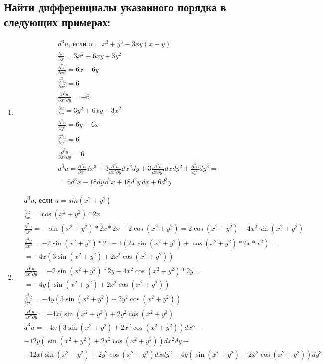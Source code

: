 \documentclass[a4paper, 12pt]{article}
\begin{document}
\subsection{Найти дифференциалы указанного порядка в следующих примерах: }
\begin{enumerate}
 \item %
 \begin{align*}
  & d^3 u \text{, если } u = x^3+y^3 - 3xy(x-y)  \\
  &\frac{\partial u}{\partial x} = 3x^2-6xy+3y^2 \\
  &\frac{\partial^2 u}{\partial x^2} = 6x -6y \\
  &\boxed{\frac{\partial^3 u}{\partial x^3}} = \boxed{6} \\
  &\boxed{\frac{\partial^3 u}{\partial x^2 \partial y}} = \boxed{-6} \\
  &\frac{\partial u}{\partial y} = 3y^2+6xy-3x^2 \\
  &\frac{\partial^2 u}{\partial y^2} = 6y + 6x \\
  &\boxed{\frac{\partial^3 u}{\partial y^3}} = \boxed{6} \\
  &\boxed{\frac{\partial^3 u}{\partial x^2 \partial y}} = \boxed{6} \\
  &\boxed{d^3u} = \frac{\partial^3 u}{\partial x^3}dx^3 + 3\frac{\partial^3 u}{\partial x^2 \partial y}dx^2dy + 3\frac{\partial^3 u}{\partial x \partial y^2}dxdy^2 +
  \frac{\partial^3 u}{\partial y^3}dy^3 = \\
  &= \boxed{6d^3x-18dy\,d^2x+18d^2y\,dx +6d^3y}
 \end{align*}
 
 \item %
 \begin{align*}
    &d^3u\text{, если } u = sin(x^2+y^2) \\
    &\frac{\partial u}{\partial x} = \cos{(x^2+y^2)*2x} \\
    &\frac{\partial^2 u}{\partial x^2} = -\sin{(x^2+y^2)}*2x*2x+2\cos{(x^2+y^2)} = 
    2\cos{(x^2+y^2)} - 4x^2\sin{(x^2+y^2)} \\
    &\boxed{\frac{\partial^3 u}{\partial x^3}} = -2\sin{(x^2+y^2)}*2x-4(2x\sin{(x^2+y^2)}+\cos{(x^2+y^2)}*2x*x^2) = \\
    &=\boxed{-4x(3\sin{(x^2+y^2)}+2x^2\cos{(x^2+y^2)})} \\
    &\boxed{\frac{\partial^3 u}{\partial x^2 \partial y}} = 
    -2\sin{(x^2+y^2)}*2y - 4x^2\cos{(x^2+y^2)}*2y = \\
    &=\boxed{-4y(\sin{(x^2+y^2)}+2x^2\cos{(x^2+y^2)})} \\
    &\boxed{\frac{\partial^3 u}{\partial y^3}} = 
    \boxed{-4y(3\sin{(x^2+y^2)}+2y^2\cos{(x^2+y^2)})} \\
    &\boxed{\frac{\partial^3 u}{\partial x^2 \partial y}} = \boxed{-4x(\sin{(x^2+y^2)}+2y^2\cos{(x^2+y^2)}} \\ 
    &d^3u = 
    -4x(3\sin{(x^2+y^2)}+2x^2\cos{(x^2+y^2)})dx^3 - \\
    &-12y(\sin{(x^2+y^2)}+2x^2\cos{(x^2+y^2)})dx^2dy - \\
    &-12x(\sin{(x^2+y^2)}+2y^2\cos{(x^2+y^2)}dxdy^2
    -4y(\sin{(x^2+y^2)}+2x^2\cos{(x^2+y^2)})dy^3
    \end{align*}
    

\end{enumerate}
\end{document}
